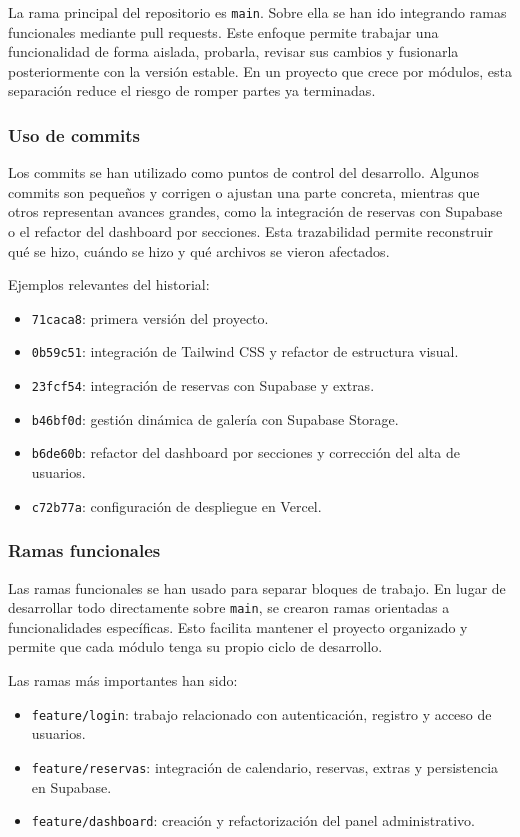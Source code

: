 \documentclass[11pt,a4paper]{article}
\begin{document}
La rama principal del repositorio es \texttt{main}. Sobre ella se han ido integrando ramas funcionales mediante pull requests. Este enfoque permite trabajar una funcionalidad de forma aislada, probarla, revisar sus cambios y fusionarla posteriormente con la versión estable. En un proyecto que crece por módulos, esta separación reduce el riesgo de romper partes ya terminadas.

\subsubsection{Uso de commits}
Los commits se han utilizado como puntos de control del desarrollo. Algunos commits son pequeños y corrigen o ajustan una parte concreta, mientras que otros representan avances grandes, como la integración de reservas con Supabase o el refactor del dashboard por secciones. Esta trazabilidad permite reconstruir qué se hizo, cuándo se hizo y qué archivos se vieron afectados.

Ejemplos relevantes del historial:
\begin{itemize}[leftmargin=1.4cm]
  \item \texttt{71caca8}: primera versión del proyecto.
  \item \texttt{0b59c51}: integración de Tailwind CSS y refactor de estructura visual.
  \item \texttt{23fcf54}: integración de reservas con Supabase y extras.
  \item \texttt{b46bf0d}: gestión dinámica de galería con Supabase Storage.
  \item \texttt{b6de60b}: refactor del dashboard por secciones y corrección del alta de usuarios.
  \item \texttt{c72b77a}: configuración de despliegue en Vercel.
\end{itemize}

\subsubsection{Ramas funcionales}
Las ramas funcionales se han usado para separar bloques de trabajo. En lugar de desarrollar todo directamente sobre \texttt{main}, se crearon ramas orientadas a funcionalidades específicas. Esto facilita mantener el proyecto organizado y permite que cada módulo tenga su propio ciclo de desarrollo.

Las ramas más importantes han sido:
\begin{itemize}[leftmargin=1.4cm]
  \item \texttt{feature/login}: trabajo relacionado con autenticación, registro y acceso de usuarios.
  \item \texttt{feature/reservas}: integración de calendario, reservas, extras y persistencia en Supabase.
  \item \texttt{feature/dashboard}: creación y refactorización del panel administrativo.
\end{itemize}
\end{document}
